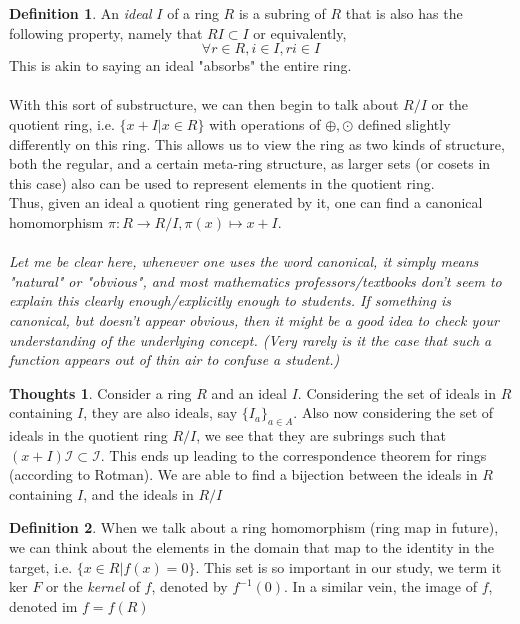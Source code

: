 \documentclass[12pt]{book}
\theoremstyle{definition}
\newtheorem*{definition}{Definition}
\newtheorem*{huh}{Thoughts}
\begin{document}
\begin{definition}
    An \textit{ideal} $I$ of a ring $R$ is a subring of $R$ that is also has the following property, namely that $RI \subset I$ or equivalently, $$\forall r \in R, i \in I, ri \in I$$ 
    This is akin to saying an ideal "absorbs" the entire ring. 
    \\\\
    With this sort of substructure, we can then begin to talk about $R/I$ or the quotient ring, i.e. $\{ x + I | x \in R \}$ with operations of $\oplus,\odot$ defined slightly differently on this ring. This allows us to view the ring as two kinds of structure, both the regular, and a certain meta-ring structure, as larger sets (or cosets in this case) also can be used to represent elements in the quotient ring. 
    \\
    Thus, given an ideal a quotient ring generated by it, one can find a canonical homomorphism $\pi: R \to R/I, \pi(x) \mapsto x + I$. \\\\ \textit{Let me be clear here, whenever one uses the word canonical, it simply means "natural" or "obvious", and most mathematics professors/textbooks don't seem to explain this clearly enough/explicitly enough to students. If something is canonical, but doesn't appear obvious, then it might be a good idea to check your understanding of the underlying concept. (Very rarely is it the case that such a function appears out of thin air to confuse a student.)}
\end{definition}
\begin{huh}
    Consider a ring $R$ and an ideal $I$. Considering the set of ideals in $R$ containing $I$, they are also ideals, say $\{I_a\}_{a \in A}$. Also now considering the set of ideals in the quotient ring $R/I$, we see that they are subrings such that $(x + I)\mathcal{I} \subset \mathcal{I}$. This ends up leading to the correspondence theorem for rings (according to Rotman). We are able to find a bijection between the ideals in $R$ containing $I$, and the ideals in $R/I$ 
\end{huh}
\begin{definition}
    When we talk about a ring homomorphism (ring map in future), we can think about the elements in the domain that map to the identity in the target, i.e. $\{ x \in R| f(x) = 0\}$. This set is so important in our study, we term it ker $F$ or the \textit{kernel} of $f$, denoted by $f^{-1} (0)$. In a similar vein, the image of $f$, denoted im $f = f(R)$
\end{definition}
\end{document}
